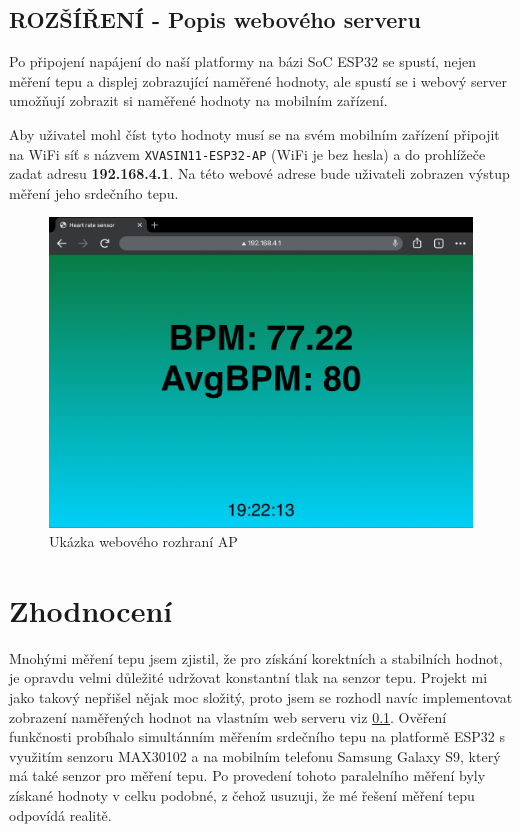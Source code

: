 \documentclass[12pt, a4paper]{article}
\begin{document}
    \subsection{ROZŠÍŘENÍ - Popis webového serveru}
    \label{subsection:pipisWebovehoServeru}
    Po připojení napájení do naší platformy na bázi SoC ESP32 se spustí, nejen měření tepu a displej zobrazující naměřené hodnoty, ale spustí se i webový server umožňují zobrazit si naměřené hodnoty na mobilním zařízení.
    
    Aby uživatel mohl číst tyto hodnoty musí se na svém mobilním zařízení připojit na WiFi síť s názvem \texttt{XVASIN11-ESP32-AP} (WiFi je bez hesla) a do prohlížeče zadat adresu \textbf{192.168.4.1}.
    Na této webové adrese bude uživateli zobrazen výstup měření jeho srdečního tepu.
    \begin{figure}[ht]
		\centering
		\includegraphics[width=0.9\linewidth]{images/webserver.png}\newline
	    \caption{Ukázka webového rozhraní AP}
	\end{figure}
    
    
    \section{Zhodnocení}
    Mnohými měření tepu jsem zjistil, že pro získání korektních a stabilních hodnot, je opravdu velmi důležité udržovat konstantní tlak na senzor tepu. Projekt mi jako takový nepřišel nějak moc složitý, proto jsem se rozhodl navíc implementovat zobrazení naměřených hodnot na vlastním web serveru viz \ref{subsection:pipisWebovehoServeru}.
    Ověření funkčnosti probíhalo simultánním měřením srdečního tepu na platformě ESP32 s využitím senzoru MAX30102 a na mobilním telefonu Samsung Galaxy S9, který má také senzor pro měření tepu. Po provedení tohoto paralelního měření byly získané hodnoty v celku podobné, z čehož usuzuji, že mé řešení měření tepu odpovídá realitě.
\end{document}
